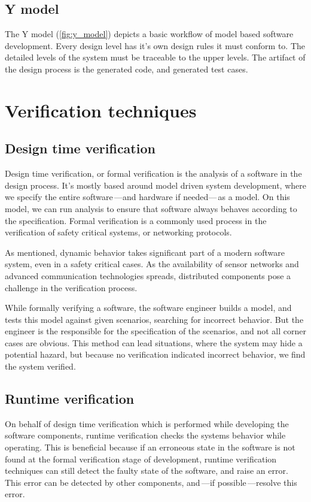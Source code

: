 \subsection{Y model}

The Y model (\cref{fig:y_model}) depicts a basic workflow of model based software development. Every design level has it's own design rules it must conform to. The detailed levels of the system must be traceable to the upper levels. The artifact of the design process is the generated code, and generated test cases.

\section{Verification techniques}

\subsection{Design time verification}

Design time verification, or formal verification is the analysis of a software in the design process. It's mostly based around model driven system development, where we specify the entire software\,---and hardware if needed---\,as a model. On this model, we can run analysis to ensure that software always behaves according to the specification. Formal verification is a commonly used process in the verification of safety critical systems, or networking protocols.

As mentioned, dynamic behavior takes significant part of a modern software system, even in a safety critical cases. As the availability of sensor networks and advanced communication technologies spreads, distributed components pose a challenge in the verification process.

While formally verifying a software, the software engineer builds a model, and tests this model against given scenarios, searching for incorrect behavior. But the engineer is the responsible for the specification of the scenarios, and not all corner cases are obvious. This method can lead situations, where the system may hide a potential hazard, but because no verification indicated incorrect behavior, we find the system verified.

\subsection{Runtime verification}

On behalf of design time verification which is performed while developing the software components, runtime verification checks the systems behavior while operating. This is beneficial because if an erroneous state in the software is not found at the formal verification stage of development, runtime verification techniques can still detect the faulty state of the software, and raise an error. This error can be detected by other components, and\,---if possible\,---resolve this error.


